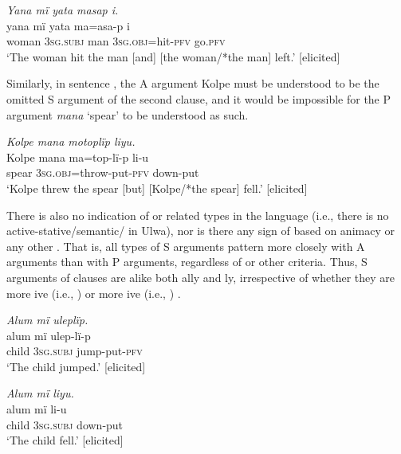 \ea%
    \label{ex:clause:25}
          \textit{Yana mï yata masap i.}\\
\gll    yana  mï      yata  ma=asa-p      i\\
    woman  \textsc{3sg.subj}  man  \textsc{3sg.obj=}hit-\textsc{pfv}  go.\textsc{pfv}\\
\glt `The woman hit the man [and] [the woman/*the man] left.’ [elicited]
\z

Similarly, in sentence , the A argument Kolpe must be understood to be the omitted S argument of the second clause, and it would be impossible for the P argument \textit{mana} ‘spear’ to be understood as such.

\ea%
    \label{ex:clause:26}
          \textit{Kolpe mana motoplïp liyu.}\\
\gll    Kolpe  mana  ma=top-lï-p        li-u\\
    [name]  spear  \textsc{3sg.obj=}throw-put-\textsc{pfv}  down-put\\
\glt `Kolpe threw the spear [but] [Kolpe/*the spear] fell.’ [elicited]
\z

There is also no indication of  or related  types in the language (i.e., there is no active-stative/semantic/ in Ulwa), nor is there any sign of  based on  animacy or any other . That is, all types of S arguments pattern more closely with A arguments than with P arguments, regardless of  or other criteria. Thus, S arguments of clauses are alike both ally and ly, irrespective of whether they are more ive (i.e., )  or more ive (i.e., ) .


\ea%
    \label{ex:clause:27}
          \textit{Alum mï uleplïp.}\\
\gll    alum  mï      ulep-lï-p\\
    child  3\textsc{sg.subj}  jump-put-\textsc{pfv}\\
\glt `The child jumped.’ [elicited]
\z

\ea%
    \label{ex:clause:28}
          \textit{Alum mï liyu.}\\
\gll    alum  mï      li-u\\
    child  \textsc{3sg.subj}  down-put\\
\glt `The child fell.’ [elicited]
\z

